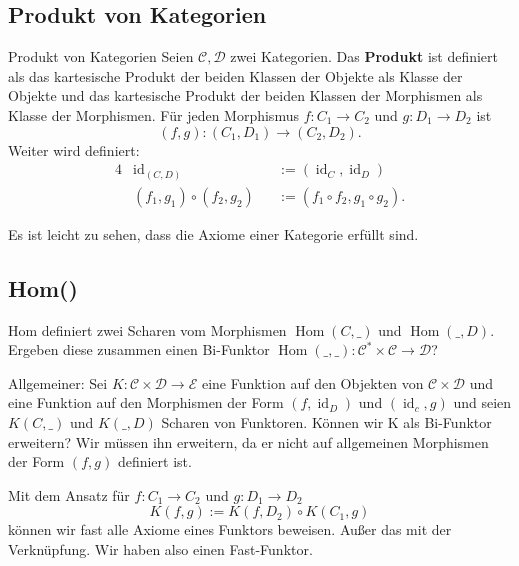 \documentclass[a4paper]{amsart}
\theoremstyle{definition}
\DeclareMathOperator{\id}{id}
\DeclareMathOperator{\Hom}{Hom}
\newcommand{\CC}{\ensuremath{\mathcal{ C }}}
\newcommand{\DD}{\ensuremath{\mathcal{ D }}}
\newcommand{\EE}{\ensuremath{\mathcal{ E }}}
\begin{document}
\subsection{Produkt von Kategorien}
\begin{Definition}{Produkt von Kategorien}
   Seien $\CC, \DD$ zwei Kategorien. Das \textbf{Produkt} ist definiert als das kartesische Produkt der beiden Klassen der Objekte als Klasse der Objekte und das kartesische Produkt der beiden Klassen der Morphismen als Klasse der Morphismen. Für jeden Morphismus $f \colon C_1 \to C_2$ und $g \colon D_1 \to D_2$ ist 
   \begin{equation}
      (f, g) \colon (C_1, D_1) \to (C_2, D_2).
   \end{equation}
   Weiter wird definiert:
   \begin{alignat}{4}
      &\id_{(C,D)}               &&:= (\id_C, \id_D)\\
      &(f_1,g_1) \circ (f_2,g_2) &&:= (f_1 \circ f_2, g_1 \circ g_2).
   \end{alignat}
\end{Definition}
Es ist leicht zu sehen, dass die Axiome einer Kategorie erfüllt sind.

\subsection{Hom()}
Hom definiert zwei Scharen vom Morphismen $\Hom( C, \_)$ und $\Hom( \_, D)$. Ergeben diese zusammen einen Bi-Funktor $\Hom( \_, \_ ) \colon \CC^* \times \CC \to \DD$?

Allgemeiner: Sei $K \colon \CC \times \DD \to \EE$ eine Funktion auf den Objekten von $\CC \times \DD$ und eine Funktion auf den Morphismen der Form $(f, \id_D)$ und $(\id_c, g)$ und seien $K(C, \_)$ und $K(\_,D)$ Scharen von Funktoren. Können wir K als Bi-Funktor erweitern? Wir müssen ihn erweitern, da er nicht auf allgemeinen Morphismen der Form $(f,g)$ definiert ist.

Mit dem Ansatz für $f \colon C_1 \to C_2$ und $g \colon D_1 \to D_2$
\begin{equation}
   K(f,g) := K(f, D_2) \circ K(C_1, g)
\end{equation}
können wir fast alle Axiome eines Funktors beweisen. Außer das mit der Verknüpfung. Wir haben also einen Fast-Funktor.
\end{document}
